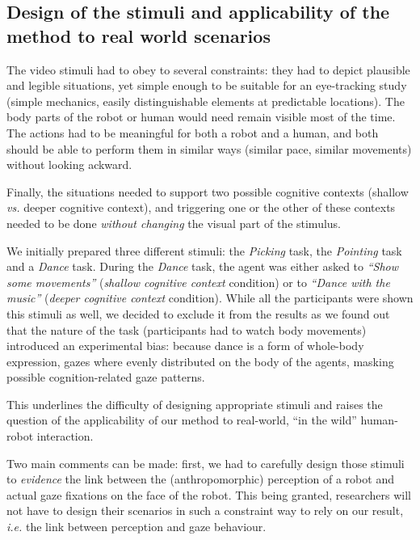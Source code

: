 \documentclass[lettersize, noapacite, twoside, HRI]{apa_HRI}
\newcommand{\ie}{\textit{i.e.}\xspace}
\newcommand{\vs}{\textit{vs.}\xspace}
\begin{document}
\subsection{Design of the stimuli and applicability of the method to real world
scenarios}
\label{stimuli_design}

The video stimuli had to obey to several constraints: they had to depict
plausible and legible situations, yet simple enough to be suitable for an
eye-tracking study (simple mechanics, easily distinguishable elements at
predictable locations). The body parts of the robot or human would need remain
visible most of the time. The actions had to be meaningful for both a robot and
a human, and both should be able to perform them in similar ways (similar pace,
similar movements) without looking ackward.

Finally, the situations needed to support two possible cognitive contexts
(shallow \vs deeper cognitive context), and triggering one or the other of these
contexts needed to be done \emph{without changing} the visual part of the
stimulus.

We initially prepared three different stimuli: the \emph{Picking} task, the
\emph{Pointing} task and a \emph{Dance} task.  During the \emph{Dance} task, the
agent was either asked to \emph{``Show some movements''} (\emph{shallow
cognitive context} condition) or to \emph{``Dance with the music''}
(\emph{deeper cognitive context} condition). While all the participants were
shown this stimuli as well, we decided to exclude it from the results as we
found out that the nature of the task (participants had to watch body movements)
introduced an experimental bias: because dance is a form of whole-body
expression, gazes where evenly distributed on the body of the agents, masking
possible cognition-related gaze patterns.

This underlines the difficulty of designing appropriate stimuli and raises the
question of the applicability of our method to real-world, ``in the wild''
human-robot interaction.

Two main comments can be made: first, we had to carefully design those stimuli
to \emph{evidence} the link between the (anthropomorphic) perception of a robot
and actual gaze fixations on the face of the robot. This being granted,
researchers will not have to design their scenarios in such a constraint way to
rely on our result, \ie the link between perception and gaze behaviour.
\end{document}
